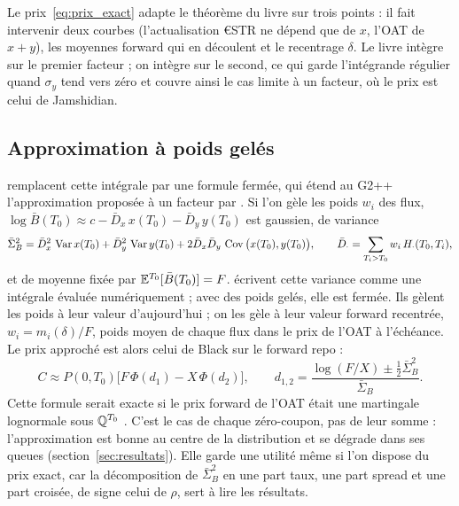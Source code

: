 Le prix~\eqref{eq:prix_exact} adapte le théorème du livre sur trois points : il fait intervenir deux courbes
(l'actualisation €STR ne dépend que de $x$, l'OAT de $x + y$), les moyennes forward qui en découlent et le
recentrage $\delta$. Le livre intègre sur le premier facteur ; on intègre sur le second, ce qui garde l'intégrande
régulier quand $\sigma_y$ tend vers zéro et couvre ainsi le cas limite à un facteur, où le prix est celui de
Jamshidian.

\subsection{Approximation à poids gelés}

\citet{Russo} remplacent cette intégrale par une formule fermée, qui étend au G2++ l'approximation proposée à
un facteur par \citet{RussoFabozzi2016}. Si l'on gèle les poids $w_i$ des flux,
$\log\bar B(T_0) \approx c - \bar D_x\,x(T_0) - \bar D_y\,y(T_0)$ est gaussien, de variance
\begin{equation}
\bar\Sigma_B^2 = \bar D_x^2\,\operatorname{Var} x(T_0) + \bar D_y^2\,\operatorname{Var} y(T_0) + 2\bar D_x\bar D_y\,\operatorname{Cov}\big(x(T_0),y(T_0)\big),
\qquad \bar D_\cdot = \sum_{T_i>T_0} w_i\,H_\cdot(T_0,T_i),
\label{eq:sigma_b}
\end{equation}
et de moyenne fixée par $\mathbb{E}^{T_0}[\bar B(T_0)] = F$. \citet{Russo} écrivent cette variance comme une intégrale
évaluée numériquement ; avec des poids gelés, elle est fermée. Ils gèlent les poids à leur valeur d'aujourd'hui ;
on les gèle à leur valeur forward recentrée, $w_i = m_i(\delta)/F$, poids moyen de chaque flux dans le prix de
l'OAT à l'échéance. Le prix approché est alors celui de Black sur le forward repo :
\begin{equation}
C \approx P(0,T_0)\big[F\,\Phi(d_1) - X\,\Phi(d_2)\big],\qquad
d_{1,2} = \frac{\log(F/X) \pm \tfrac12\bar\Sigma_B^2}{\bar\Sigma_B}.
\label{eq:black}
\end{equation}
Cette formule serait exacte si le prix forward de l'OAT était une martingale lognormale sous $\mathbb{Q}^{T_0}$
\citep[CM3, p.~28]{Hillairet2026}. C'est le cas de chaque zéro-coupon, pas de leur somme : l'approximation est
bonne au centre de la distribution et se dégrade dans ses queues (section~\ref{sec:resultats}). Elle garde une
utilité même si l'on dispose du prix exact, car la décomposition de $\bar\Sigma_B^2$ en une part taux, une part
spread et une part croisée, de signe celui de $\rho$, sert à lire les résultats.
